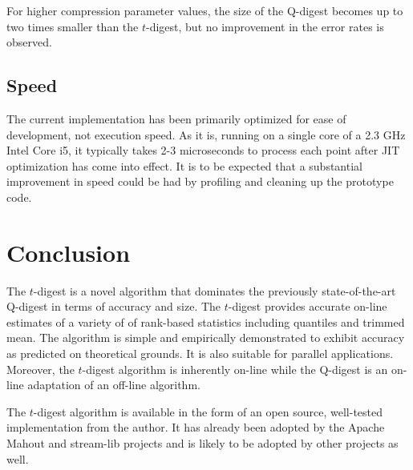 \documentclass[11pt]{amsart}
\begin{document}
For higher compression parameter values, the size of the Q-digest becomes up to two times smaller than the $t$-digest, but no improvement in the error rates is observed.

\subsection{Speed}
The current implementation has been primarily optimized for ease of development, not execution speed.  As it is, running on a single core of a 2.3 GHz Intel Core i5, it typically takes 2-3 microseconds to process each point after JIT optimization has come into effect.  It is to be expected that a substantial improvement in speed could be had by profiling and cleaning up the prototype code.

\section{Conclusion}
The $t$-digest is a novel algorithm that dominates the previously state-of-the-art Q-digest in terms of accuracy and size.  The $t$-digest provides accurate on-line estimates of a variety of of rank-based statistics including quantiles and trimmed mean.  The algorithm is simple and empirically demonstrated to exhibit accuracy as predicted on theoretical grounds.  It is also suitable for parallel applications.  Moreover, the $t$-digest algorithm is inherently on-line while the Q-digest is an on-line adaptation of an off-line algorithm.

The $t$-digest algorithm is available in the form of an open source, well-tested implementation from the author.  It has already been adopted by the Apache Mahout and stream-lib projects and is likely to be adopted by other projects as well.


{}
\end{document}
